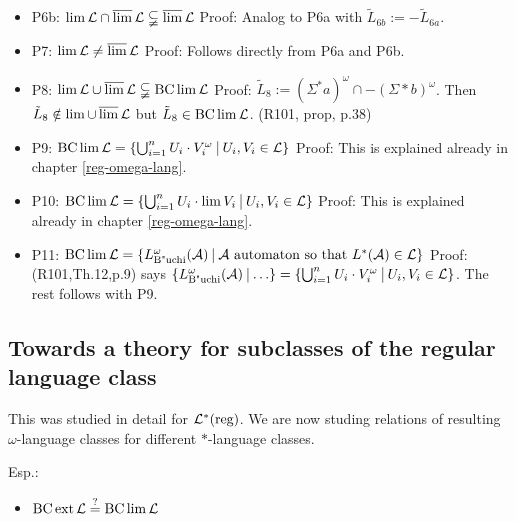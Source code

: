 \begin{itemize}
\item P6b: $\lim \mathcal{L} \cap \operatorname{\overline{lim}} \mathcal{L} \subsetneqq \operatorname{\overline{lim}} \mathcal{L}$ \newline
Proof: Analog to P6a with $\tilde{L}_{6b} := -\tilde{L}_{6a}$.
\item P7: $\lim \mathcal{L} \neq \operatorname{\overline{lim}} \mathcal{L}$ \newline
Proof: Follows directly from P6a and P6b.
\item P8: $\lim \mathcal{L} \cup \operatorname{\overline{lim}} \mathcal{L} \subsetneqq \operatorname{BC} \lim \mathcal{L}$ \newline
Proof: $\tilde{L}_8 := (\Sigma^*a)^\omega \cap -(\Sigma*b)^\omega$. Then $\tilde{L}_8 \notin \lim \cup \operatorname{\overline{lim}} \mathcal{L}$ but $\tilde{L}_8 \in \operatorname{BC} \lim \mathcal{L}$. (R101, prop, p.38)
\item P9: $\BC \lim \Lang = \Set{ \bigcup_{i=1}^n U_i \cdot V_i^\omega}{U_i, V_i \in \Lang}$ \newline
Proof: This is explained already in chapter \ref{reg-omega-lang}. 
\item P10: $\BC \lim \Lang = \Set{\bigcup_{i=1}^n U_i \cdot \lim V_i}{U_i, V_i \in \Lang}$ \newline
Proof: This is explained already in chapter \ref{reg-omega-lang}. 
\item P11: $\BC \lim \Lang = \Set{L_{\text{B"uchi}}^\omega(\A)}{\A \text{ automaton so that } L^*(\A) \in \Lang}$ \newline
Proof: (R101,Th.12,p.9) says $\Set{L_{\text{B"uchi}}^\omega(\A)}{\dots} = \Set{ \bigcup_{i=1}^n U_i \cdot V_i^\omega}{U_i, V_i \in \Lang}$. The rest follows with P9.
\end{itemize}

\subsection{Towards a theory for subclasses of the regular language class} %

This was studied in detail for $\mathcal{L}^*(\text{reg})$. We are now studing relations of resulting $\omega$-language classes for different $*$-language classes.

Esp.:
\begin{itemize}
\item $\operatorname{BC} \operatorname{ext} \mathcal{L} \overset{?}{=} \operatorname{BC} \lim \mathcal{L}$
\end{itemize}

